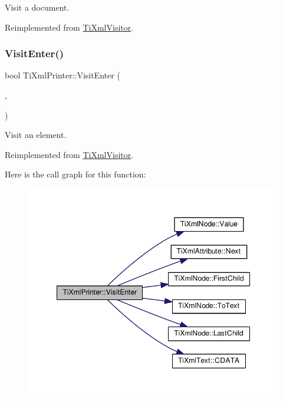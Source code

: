 Visit a document. 



Reimplemented from \hyperlink{class_ti_xml_visitor_a07baecb52dd7d8716ae2a48ad0956ee0}{Ti\+Xml\+Visitor}.

\mbox{\label{class_ti_xml_printer_a6dccaf5ee4979f13877690afe28721e8}} 
\subsubsection{\texorpdfstring{Visit\+Enter()}{VisitEnter()}\hspace{0.1cm}{\footnotesize\ttfamily [2/2]}}
{\footnotesize\ttfamily bool Ti\+Xml\+Printer\+::\+Visit\+Enter (\begin{DoxyParamCaption}\item[{const \hyperlink{class_ti_xml_element}{Ti\+Xml\+Element} \&}]{,  }\item[{const \hyperlink{class_ti_xml_attribute}{Ti\+Xml\+Attribute} $\ast$}]{ }\end{DoxyParamCaption})\hspace{0.3cm}{\ttfamily [virtual]}}



Visit an element. 



Reimplemented from \hyperlink{class_ti_xml_visitor_af6c6178ffa517bbdba95d70490875fff}{Ti\+Xml\+Visitor}.

Here is the call graph for this function\+:
\nopagebreak
\begin{figure}[H]
\begin{center}
\leavevmode
\includegraphics[width=348pt]{class_ti_xml_printer_a6dccaf5ee4979f13877690afe28721e8_cgraph}
\end{center}
\end{figure}
\mbox{\label{class_ti_xml_printer_a0a636046fa589b6d7f3e5bd025b3f33e}} 
